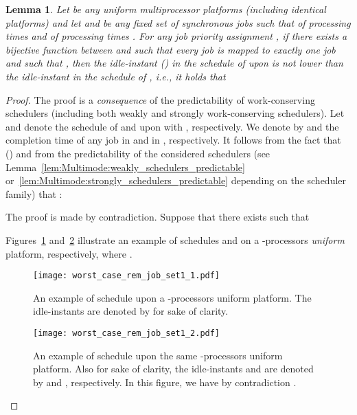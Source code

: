 \documentclass{article}
\newtheorem{validity test}{Validity Test}
\newtheorem{Lemma}{Lemma}
\newtheorem{proof}{Proof}
\begin{document}
\begin{Lemma}
\label{lem:Multimode:worst_case_rem_jobs_set_base}
Let  be any uniform multiprocessor platforms (including identical platforms) and let  and  be any fixed set of  synchronous jobs such that  of processing times  and  of processing times . For any job priority assignment , if there exists a bijective function between  and  such that every job  is mapped to exactly one job  and such that , then the  idle-instant  () in the schedule of  upon  is not lower than the  idle-instant  in the schedule of , i.e., it holds  that

\end{Lemma} 
\begin{proof}
The proof is a \emph{consequence} of the predictability of work-conserving schedulers (including both weakly and strongly work-conserving schedulers). Let  and  denote the schedule of  and  upon  with , respectively. We denote by  and  the completion time of any job  in  and  in , respectively. It follows from the fact that  () and from the predictability of the considered schedulers (see Lemma~\ref{lem:Multimode:weakly_schedulers_predictable} or~\ref{lem:Multimode:strongly_schedulers_predictable} depending on the scheduler family) that :

The proof is made by contradiction. Suppose that there exists  such that 

Figures~\ref{fig:Multimode:worst_case_rem_job_set1_1} and~\ref{fig:Multimode:worst_case_rem_job_set1_2} illustrate an example of schedules  and  on a -processors \emph{uniform} platform, respectively, where . 
\begin{figure}[t!]
\begin{center}
\texttt{[image: worst\_case\_rem\_job\_set1\_1.pdf]}
\caption{An example of schedule  upon a -processors uniform platform. The idle-instants  are denoted by  for sake of clarity.}
\label{fig:Multimode:worst_case_rem_job_set1_1}
\end{center}
\end{figure}

\begin{figure}[t!]
\begin{center}
\texttt{[image: worst\_case\_rem\_job\_set1\_2.pdf]}
\caption{An example of schedule  upon the same -processors uniform platform. Also for sake of clarity, the idle-instants  and  are denoted by  and , respectively. In this figure, we have by contradiction .}
\label{fig:Multimode:worst_case_rem_job_set1_2}
\end{center}
\end{figure}


\end{proof}
\end{document}
